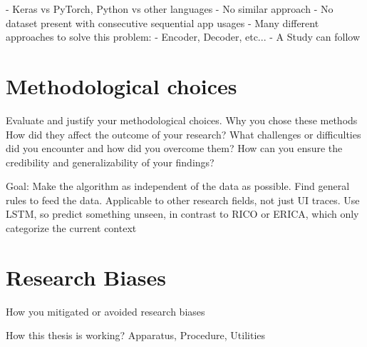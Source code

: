 - Keras vs PyTorch, Python vs other languages
- No similar approach
- No dataset present with consecutive sequential app usages
- Many different approaches to solve this problem:
    - Encoder, Decoder, etc...
- A Study can follow

\section{Methodological choices}
Evaluate and justify your methodological choices.
Why you chose these methods
How did they affect the outcome of your research?
What challenges or difficulties did you encounter and how did you overcome them?
How can you ensure the credibility and generalizability of your findings?


Goal: Make the algorithm as independent of the data as possible.
Find general rules to feed the data.
Applicable to other research fields, not just UI traces.
Use LSTM, so predict something unseen, in contrast to RICO or ERICA, which only categorize the current context


\section{Research Biases}
How you mitigated or avoided research biases

How this thesis is working?
Apparatus, Procedure, Utilities
